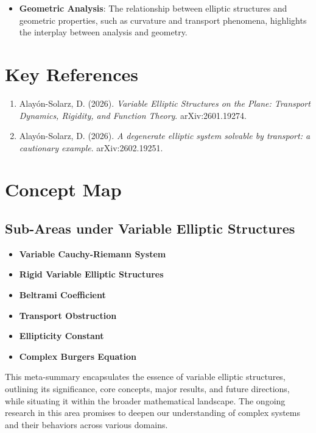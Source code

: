 \documentclass[11pt,a4paper]{article}
\begin{document}
\begin{itemize}
\item \textbf{Geometric Analysis}: The relationship between elliptic structures and geometric properties, such as curvature and transport phenomena, highlights the interplay between analysis and geometry.
\end{itemize}

\section{Key References}

\begin{enumerate}
\item Alayón-Solarz, D. (2026). \textit{Variable Elliptic Structures on the Plane: Transport Dynamics, Rigidity, and Function Theory}. arXiv:2601.19274.
\item Alayón-Solarz, D. (2026). \textit{A degenerate elliptic system solvable by transport: a cautionary example}. arXiv:2602.19251.
\end{enumerate}

\section{Concept Map}

\subsection{Sub-Areas under Variable Elliptic Structures}

\begin{itemize}
\item \textbf{Variable Cauchy-Riemann System}
\item \textbf{Rigid Variable Elliptic Structures}
\item \textbf{Beltrami Coefficient}
\item \textbf{Transport Obstruction}
\item \textbf{Ellipticity Constant}
\item \textbf{Complex Burgers Equation}
\end{itemize}

This meta-summary encapsulates the essence of variable elliptic structures, outlining its significance, core concepts, major results, and future directions, while situating it within the broader mathematical landscape. The ongoing research in this area promises to deepen our understanding of complex systems and their behaviors across various domains.
\end{document}
